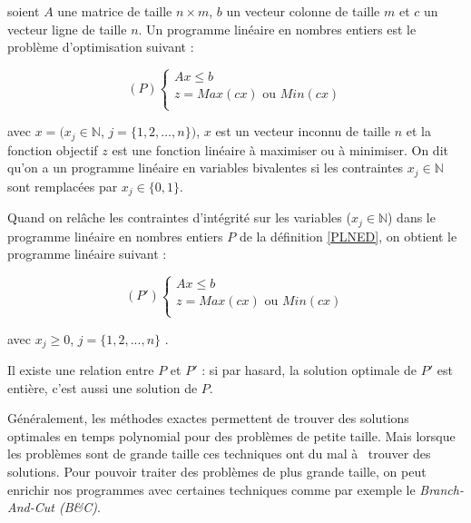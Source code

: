 \begin{Def} 
	\label{PLNED}\cite{Sakar84}
	soient $A$ une matrice de taille $n \times m$, $b$ un vecteur colonne de taille $m$ et $c$ un vecteur ligne de taille $n$. Un programme linéaire en nombres entiers est le problème d'optimisation suivant : 
	
	$$
	(P) \left\{
	\begin{array}{ll}
	Ax \leq b   \\
	z=Max(cx) \textrm{ ou } Min(cx)\\ 
	\end{array}
	\right.
	$$
	
	avec $x=(x_j \in \pmb{\mathbb{N}}$, $j = \{1, 2, \dots, n\})$,  $x$ est un vecteur  inconnu de taille $n$ et la fonction objectif $z$ est une fonction linéaire à maximiser ou à minimiser. On dit qu'on a un programme linéaire en variables bivalentes si les contraintes $x_j \in \pmb{\mathbb{N}}$ sont remplacées par $x_j \in \{0,1\}$.
\end{Def}


\begin{Def}\cite{Sakar84}
	\label{RPLNED}
	Quand on relâche les contraintes d'intégrité sur les variables ($x_j \in \pmb{\mathbb{N}}$) dans le programme linéaire en nombres entiers $P$ de la définition \ref{PLNED}, on obtient le programme linéaire suivant : 
	
	$$
	(P') \left\{
	\begin{array}{ll}
	Ax \leq b   \\
	z=Max(cx) \textrm{ ou } Min(cx)\\ 
	\end{array}
	\right.
	$$
	
	avec $x_j \geq 0$, $j = \{1,2,...,n\}$ . 
\end{Def}

Il existe une relation entre $P$ et  $P'$ : si par hasard, la solution optimale de $P'$ est entière, c'est aussi une solution de $P$.

Généralement, les méthodes exactes permettent de trouver des solutions optimales en temps polynomial pour des problèmes de petite taille. Mais lorsque les problèmes sont de grande taille ces techniques ont du mal à  trouver des solutions. Pour pouvoir traiter des problèmes de plus grande taille, on peut enrichir nos programmes avec certaines techniques comme par exemple le \textit{Branch-And-Cut (B\&C)}.


